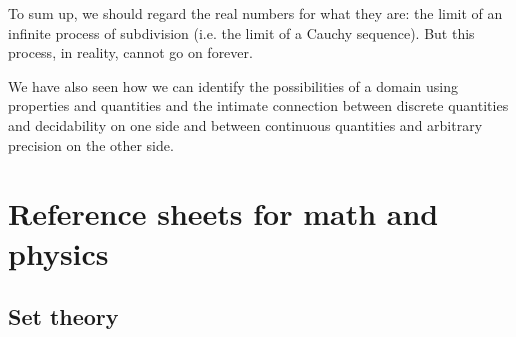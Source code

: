 \documentclass[11pt,letterpaper,fleqn]{memoir} %
\begin{document}
To sum up, we should regard the real numbers for what they are: the limit of an infinite process of subdivision (i.e. the limit of a Cauchy sequence). But this process, in reality, cannot go on forever.


We have also seen how we can identify the possibilities of a domain using properties and quantities and the intimate connection between discrete quantities and decidability on one side and between continuous quantities and arbitrary precision on the other side.

\appendix

\chapter{Reference sheets for math and physics}

\section{Set theory}
\end{document}
